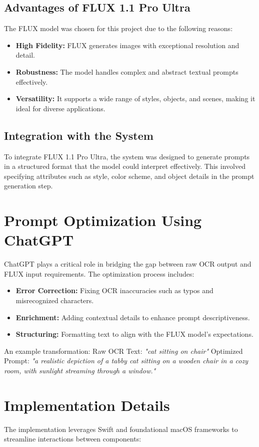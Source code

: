 \subsection{Advantages of FLUX 1.1 Pro Ultra}
The FLUX model was chosen for this project due to the following reasons:
\begin{itemize}
    \item \textbf{High Fidelity:} FLUX generates images with exceptional resolution and detail.
    \item \textbf{Robustness:} The model handles complex and abstract textual prompts effectively.
    \item \textbf{Versatility:} It supports a wide range of styles, objects, and scenes, making it ideal for diverse applications.
\end{itemize}

\subsection{Integration with the System}
To integrate FLUX 1.1 Pro Ultra, the system was designed to generate prompts in a structured format that the model could interpret effectively. This involved specifying attributes such as style, color scheme, and object details in the prompt generation step.

\section{Prompt Optimization Using ChatGPT}
ChatGPT plays a critical role in bridging the gap between raw OCR output and FLUX input requirements. The optimization process includes:
\begin{itemize}
    \item \textbf{Error Correction:} Fixing OCR inaccuracies such as typos and misrecognized characters.
    \item \textbf{Enrichment:} Adding contextual details to enhance prompt descriptiveness.
    \item \textbf{Structuring:} Formatting text to align with the FLUX model's expectations.
\end{itemize}
An example transformation:\newline
Raw OCR Text: \textit{"cat sitting on chair"}\newline
Optimized Prompt: \textit{"a realistic depiction of a tabby cat sitting on a wooden chair in a cozy room, with sunlight streaming through a window."}

\section{Implementation Details}
The implementation leverages Swift and foundational macOS frameworks to streamline interactions between components:
